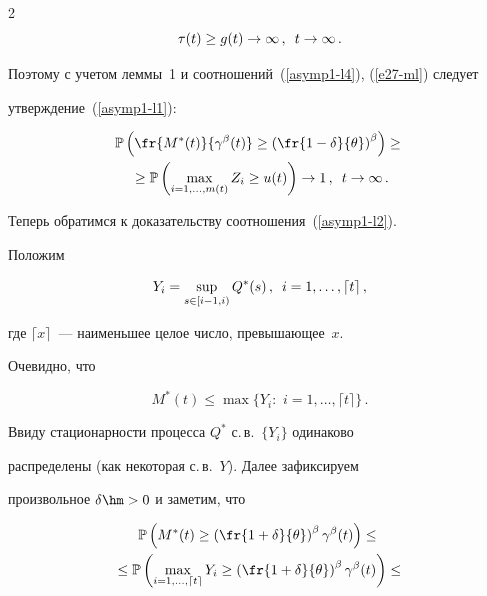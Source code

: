 \begin{multicols}{2}
$$


\tau(t)\ge g(t) \to \infty\,,\enskip t \to \infty\,.


$$


Поэтому с учетом леммы~1 и соотношений~(\ref{asymp1-l4}), (\ref{e27-ml}) следует 


утверждение~(\ref{asymp1-l1}):


\begin{multline*}


\mathbb{P}\left(\fr{M^*(t)}{\gamma^\beta(t)} \geq


 \left(


\fr{1-\delta}{\theta} \right)^\beta \right)\geq{}\\


{}\geq \mathbb{P}\left(


\max\limits_{i=1,\ldots,m(t)}Z_i \geq u(t) \right) \to 1\,,\enskip t \to \infty\,.


\end{multline*}


Теперь обратимся к доказательству соотношения~(\ref{asymp1-l2}).


Положим


$$


Y_i=\sup\limits_{s \in [i-1,i)} Q^*(s)\,,\enskip i=1,\ldots,\lceil t \rceil\,,


$$


где $\lceil x \rceil$~--- наименьшее целое число, превы\-ша\-ющее~$x$.


Очевидно, что


$$


M^*(t) \leq \max\{Y_i:\,\,i=1,\ldots,\lceil t \rceil\}\,.


$$


Ввиду  стационарности  процесса $Q^*$ с.\,в.\ $\{Y_i\}$ одинаково


распределены (как некоторая с.\,в.~$Y$).  Далее зафиксируем


произвольное $\delta\hm>0$ и заметим, что


\begin{multline}


\mathbb{P} \left( M^*(t) \geq \left(\fr{1+\delta}{\theta}\right)^\beta


\gamma^\beta(t) \right) \leq{}\\


{}\leq \mathbb{P} \left( \max_{i=1,\ldots,\lceil t \rceil} Y_i \geq 


\left(\fr{1+\delta}{\theta}\right)^\beta


\gamma^\beta(t)  \right)\leq{}\\



\end{multline}
\end{multicols}

